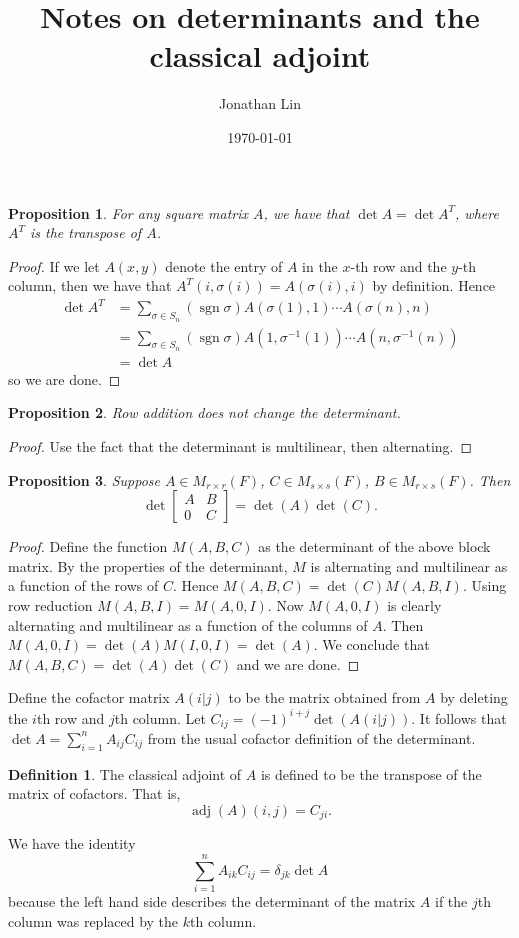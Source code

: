 \documentclass[12pt]{article}
\title{Notes on determinants and the classical adjoint}
\author{Jonathan Lin}
\date{\today}
\theoremstyle{plain}
\newtheorem{prop}{Proposition}
\theoremstyle{definition}
\newtheorem{defn}{Definition}
\newcommand{\sgn}{\operatorname{sgn}}
\newcommand{\adj}{\operatorname{adj}}
\begin{document}
\maketitle

\begin{prop}
For any square matrix $A$, we have that $\det{A} = \det{A^T}$, where $A^T$ is the transpose of $A$.
\end{prop}
\begin{proof}
If we let $A(x, y)$ denote the entry of $A$ in the $x$-th row and the $y$-th column, then we have that $A^T(i, \sigma(i)) = A(\sigma(i), i)$ by definition. Hence
\begin{align*}
	\det{A^T} &= \sum_{\sigma \in S_n}(\sgn{\sigma})A(\sigma(1), 1)\cdots A(\sigma(n), n) \\
		&= \sum_{\sigma \in S_n}(\sgn{\sigma})A(1, \sigma^{-1}(1))\cdots A(n, \sigma^{-1}(n)) \\
		&= \det{A}
\end{align*}
so we are done.
\end{proof}

\begin{prop}
Row addition does not change the determinant.
\end{prop}
\begin{proof}
Use the fact that the determinant is multilinear, then alternating.
\end{proof}

\begin{prop}
Suppose $A \in M_{r \times r}(F)$, $C \in M_{s \times s}(F)$, $B \in M_{r \times s}(F)$. Then
\[\det \begin{bmatrix} A & B \\ 0 & C\end{bmatrix} = \det(A)\det(C).\]
\end{prop}
\begin{proof}
	Define the function $M(A, B, C)$ as the determinant of the above block matrix. By the properties of the determinant, $M$ is alternating and multilinear as a function of the rows of $C$. Hence $M(A, B, C) = \det(C)M(A, B, I)$. Using row reduction $M(A, B, I) = M(A, 0, I)$. Now $M(A, 0, I)$ is clearly alternating and multilinear as a function of the columns of $A$. Then $M(A, 0, I) = \det(A)M(I, 0, I) = \det(A)$. We conclude that $M(A, B, C) = \det(A)\det(C)$ and we are done.
\end{proof}

Define the cofactor matrix $A(i | j)$ to be the matrix obtained from $A$ by deleting the $i$th row and $j$th column. Let $C_{ij} = (-1)^{i + j}\det(A(i|j))$. It follows that $\det{A} = \sum_{i = 1}^n A_{ij}C_{ij}$ from the usual cofactor definition of the determinant.

\begin{defn}
The classical adjoint of $A$ is defined to be the transpose of the matrix of cofactors. That is,
\[ \adj(A)(i, j) = C_{ji}.\]
\end{defn}

We have the identity 
\[\sum_{i = 1}^nA_{ik}C_{ij} = \delta_{jk}\det{A} \]
because the left hand side describes the determinant of the matrix $A$ if the $j$th column was replaced by the $k$th column.
\end{document}
